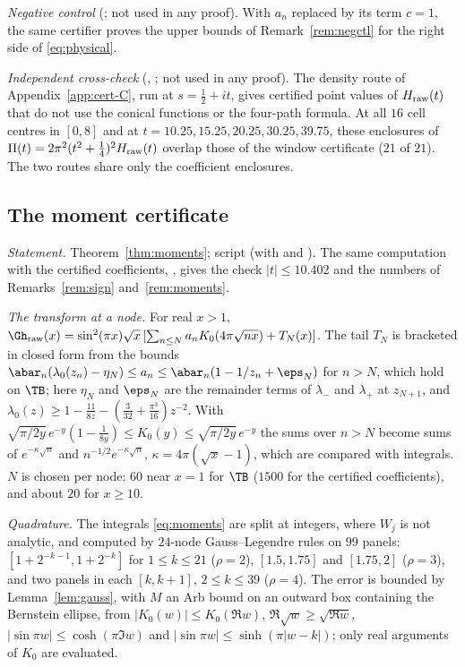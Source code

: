 \emph{Negative control} (; not used in any proof). With $a_n$ replaced by its term $c=1$, the same certifier proves the
upper bounds of Remark~\ref{rem:negctl} for the right side of \eqref{eq:physical}.

\emph{Independent cross-check} (, ; not used in any proof). The
density route of Appendix~\ref{app:cert-C}, run at $s=\frac12+it$, gives certified point values of $H_{\rm raw}(t)$ that do not use the
conical functions or the four-path formula. At all $16$ cell centres in $[0,8]$ and at $t=10.25,15.25,20.25,30.25,39.75$, these enclosures of
$\Pi(t)=2\pi^2(t^2+\frac14)^2H_{\rm raw}(t)$ overlap those of the window certificate ($21$ of $21$). The two routes share only the coefficient
enclosures.

\subsection{The moment certificate}\label{app:cert-M}

\emph{Statement.} Theorem~\ref{thm:moments}; script  (with  and
). The same computation with the certified coefficients, , gives the check $|t|\le10.402$
and the numbers of Remarks~\ref{rem:sign} and~\ref{rem:moments}.

\emph{The transform at a node.} For real $x>1$, $\Gh_{\rm raw}(x)=\sin^2(\pi x)\sqrt x\,[\sum_{n\le N}a_nK_0(4\pi\sqrt{nx})+T_N(x)]$. The tail $T_N$ is
bracketed in closed form from the bounds $\abar_n(\lambda_0(z_n)-\eta_N)\le a_n\le\abar_n(1-1/z_n+\eps_N)$ for $n>N$, which hold on $\TB$; here
$\eta_N$ and $\eps_N$ are the remainder terms of $\lambda_-$ and $\lambda_+$ at $z_{N+1}$, and $\lambda_0(z)\ge1-\frac{11}{8z}-(\frac3{32}+\frac{\pi^3}{16})z^{-2}$. With
$\sqrt{\pi/2y}\,e^{-y}(1-\frac1{8y})\le K_0(y)\le\sqrt{\pi/2y}\,e^{-y}$ the sums over $n>N$ become sums of $e^{-\kappa\sqrt n}$ and
$n^{-1/2}e^{-\kappa\sqrt n}$, $\kappa=4\pi(\sqrt x-1)$, which are compared with integrals. $N$ is chosen per node: $60$ near $x=1$ for $\TB$
($1500$ for the certified coefficients), and about $20$ for $x\ge10$.

\emph{Quadrature.} The integrals \eqref{eq:moments} are split at integers, where $W_j$ is not analytic, and computed by $24$-node
Gauss--Legendre rules on $99$ panels: $[1+2^{-k-1},1+2^{-k}]$ for $1\le k\le21$ ($\rho=2$), $[1.5,1.75]$ and $[1.75,2]$ ($\rho=3$), and two panels in each
$[k,k+1]$, $2\le k\le39$ ($\rho=4$). The error is bounded by Lemma~\ref{lem:gauss}, with $M$ an Arb bound on an outward box containing the
Bernstein ellipse, from $|K_0(w)|\le K_0(\Re w)$, $\Re\sqrt w\ge\sqrt{\Re w}$, $|\sin\pi w|\le\cosh(\pi\Im w)$ and $|\sin\pi w|\le\sinh(\pi|w-k|)$; only
real arguments of $K_0$ are evaluated.

